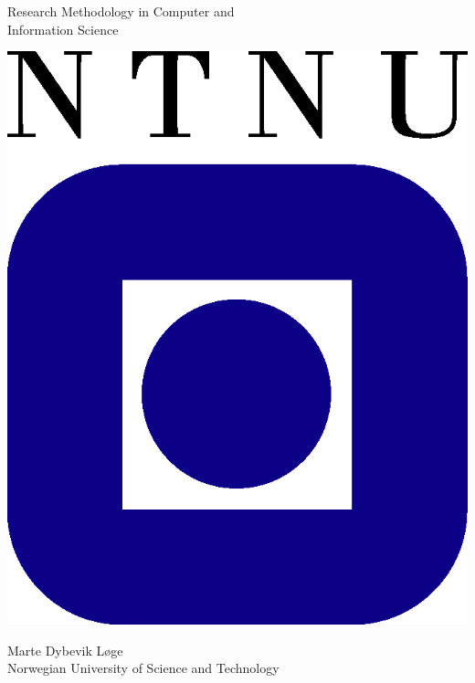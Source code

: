 \begin{titlepage}
\begin{center}

    
  {\Huge Research Methodology in Computer and}\\[0.3cm]
  {\Huge Information Science} \\


  
  \vspace{3.0cm}

  \includegraphics{ntnu-logo2.png}

  \vspace{4.0cm}

  {\Large Marte Dybevik Løge} \\ [0.5cm]
  {\Large Norwegian University of Science and Technology}\\

  \vspace{4cm}

  \noindent\makebox[\linewidth]{\rule{\textwidth}{1pt}} \\[1cm]


\end{center}
\end{titlepage}
